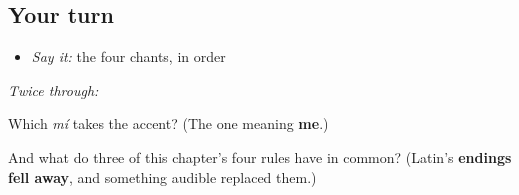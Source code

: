 \subsection*{Your turn}
\begin{itemize}
\raggedright
  \item \emph{Say it:} the four chants, in order
\end{itemize}

\emph{Twice through:}

\begin{tcolorbox}[breakable,colback=teal!4,colframe=teal!35!black,title={Before you move on}]
Which \emph{mí} takes the accent? (The one meaning \textbf{me}.)

And what do three of this chapter's four rules have in common? (Latin's \textbf{endings fell away}, and something audible replaced them.)
\end{tcolorbox}
